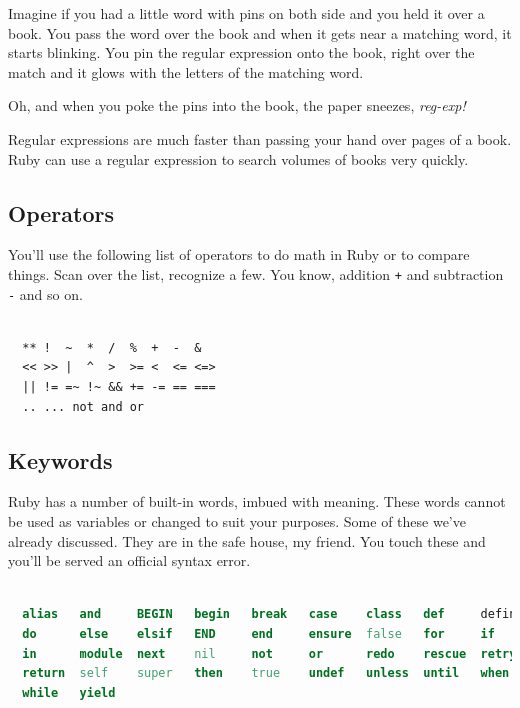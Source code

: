 \documentclass[10pt,twoside]{report}
\begin{document}
Imagine if you had a little word with pins on both side and you held
it over a book.  You pass the word over the book and when it gets near
a matching word, it starts blinking.  You pin the regular expression
onto the book, right over the match and it glows with the letters of
the matching word.

Oh, and when you poke the pins into the book, the paper sneezes, {\em
  reg-exp!}

Regular expressions are much faster than passing your hand over pages
of a book.  Ruby can use a regular expression to search volumes of
books very quickly.



\subsection{Operators}



You'll use the following list of operators to do math in Ruby or to
compare things. Scan over the list, recognize a few.  You know,
addition \lstinline[breaklines=true]|+| and subtraction
\lstinline[breaklines=true]|-| and so on.


\begin{lstlisting}

  ** !  ~  *  /  %  +  -  & 
  << >> |  ^  >  >= <  <= <=>
  || != =~ !~ && += -= == ===
  .. ... not and or

\end{lstlisting}




\subsection{Keywords}



Ruby has a number of built-in words, imbued with meaning.  These words
cannot be used as variables or changed to suit your purposes.  Some of
these we've already discussed.  They are in the safe house, my friend.
You touch these and you'll be served an official syntax error.


\begin{lstlisting}[basicstyle=\ttfamily\color{basiccolor},
    commentstyle = \ttfamily\color{commentcolor},
    keywordstyle=\ttfamily\color{keywordscolor},
    stringstyle=\color{stringcolor},
    language=Ruby,
    basicstyle=\small\ttfamily,
    showstringspaces=false,
  ]

  alias   and     BEGIN   begin   break   case    class   def     defined 
  do      else    elsif   END     end     ensure  false   for     if 
  in      module  next    nil     not     or      redo    rescue  retry
  return  self    super   then    true    undef   unless  until   when 
  while   yield

\end{lstlisting}
\end{document}
